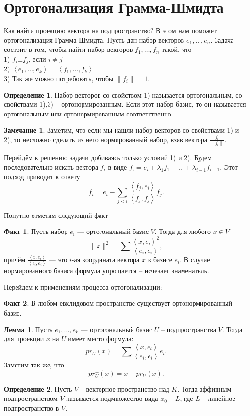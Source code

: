 \documentclass[10pt,a4paper,oneside]{book}
\theoremstyle{definition}
\newtheorem*{rem}{Замечание}
\newtheorem{defn}{Определение}
\newtheorem*{fact}{Факт}
\newtheorem{lem}{Лемма}
\def\lan{\left\langle }
\def\ran{\right\rangle}
\def\dfn{\begin{defn}}
\def\edfn{\end{defn}}
\def\lm{\begin{lem}}
\def\elm{\end{lem}}
\def\rm{\begin{rem}}
\def\erm{\end{rem}}
\def\fct{\begin{fact}}
\def\efct{\end{fact}}
\begin{document}
\section{Ортогонализация Грамма-Шмидта}



Как найти проекцию вектора на подпространство? В этом нам поможет ортогонализация Грамма-Шмидта. Пусть дан набор векторов $e_1,\dots, e_n$. Задача состоит в том, чтобы найти набор векторов $f_1,\dots,f_n$ такой, что\\
1) $f_i \bot f_j$, если $i\neq j$\\
2) $\lan e_1,\dots,e_k\ran=\lan f_1,\dots,f_k\ran$\\
3) Так же можно потребовать, чтобы $\|f_i\|=1$.

\dfn Набор векторов со свойством 1) называется ортогональным, со свойствами 1),3) -- ортонормированным. Если этот набор базис, то он называется ортогональным или ортонормированным соответственно.
\edfn 

\rm Заметим, что если мы нашли набор векторов со свойствами 1) и 2), то несложно сделать из него нормированный набор, взяв вектора $\frac{f_i}{\|f_i\|}$. 
\erm

Перейдём к решению задачи добиваясь только условий 1) и 2). Будем последовательно искать вектора $f_i$ в виде $f_i=e_i+\lambda_1 f_1 +\dots + \lambda_{i-1} f_{i-1}$. Этот подход приводит к ответу
$$f_i=e_i-\sum_{j<i} \frac{\lan f_j,e_i\ran}{\lan f_j,f_j\ran}f_j.$$

Попутно отметим следующий факт

\fct Пусть набор $e_i$ --- ортогональный базис $V$. Тогда для любого $x\in V$ 
$$\|x\|^2= \sum \frac{\lan x, e_i\ran^2}{\lan e_i, e_i\ran},$$
причём $\frac{\lan x, e_i\ran}{\lan e_i, e_i\ran}$ --- это $i$-ая координата вектора $x$ в базисе $e_i$. В случае нормированного базиса формула упрощается -- исчезает знаменатель.
\efct

Перейдем к применениям процесса ортогонализации:
\fct В любом евклидовом пространстве существует ортонормированный базис.
\efct

\lm Пусть $ e_1,\dots, e_k$ --- ортогональный базис $U$ -- подпространства $V$. Тогда для проекции $x$ на $U$ имеет место формула:
$$ pr_U(x)= \sum \frac{\lan x,e_i\ran}{\lan e_i,e_i\ran} e_i.$$
Заметим так же, что
$$pr_U^{\bot}(x)=x-pr_U(x).$$
\elm


\dfn Пусть $V$ -- векторное пространство над $K$. Тогда аффинным подпространством $V$ называется подмножество вида $x_0+L$, где $L$ -- линейное подпространство в $V$.
\edfn
\end{document}
